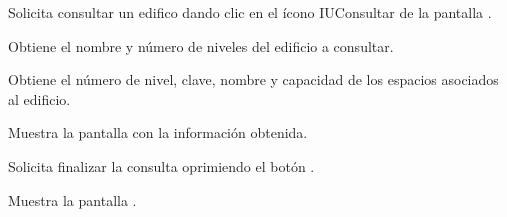 \begin{UCtrayectoria}
	\UCpaso [\UCactor] Solicita consultar un edifico dando clic en el ícono IUConsultar de la pantalla . 
	
	\UCpaso [\UCsist] Obtiene el nombre y número de niveles del edificio a consultar.
	
	\UCpaso [\UCsist] Obtiene el número de nivel, clave, nombre y capacidad de los espacios asociados al edificio.
	
	\UCpaso [\UCsist] Muestra la pantalla  con la información obtenida.
	
	\UCpaso [\UCactor] Solicita finalizar la consulta oprimiendo el botón . 
	
	\UCpaso [\UCsist] Muestra la pantalla .
	
\end{UCtrayectoria}

